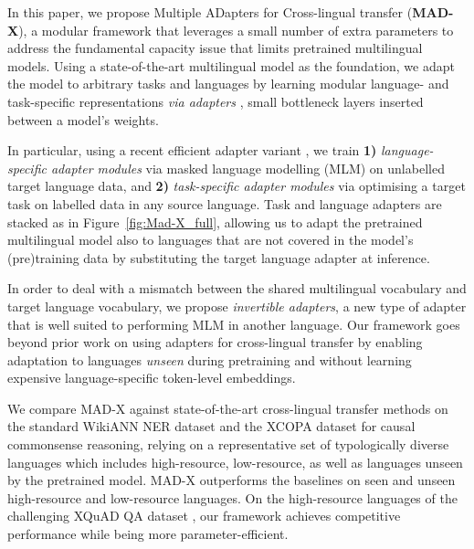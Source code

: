\documentclass[11pt,a4paper]{article}
\newcommand{\model}[1]{\textsc{MAD-X}}
\newcommand{\wann}[1]{WikiANN}
\begin{document}
In this paper, we propose \textsc{M}ultiple \textsc{AD}apters for Cross-lingual transfer (\textbf{\model{}}), a modular framework that leverages a small number of extra parameters to address the fundamental capacity issue that limits pretrained multilingual models. Using a state-of-the-art multilingual model as the foundation, we adapt the model to arbitrary tasks and languages by learning modular language- and task-specific representations \textit{via adapters} \cite{Rebuffi2017adapters,Houlsby2019adapters}, small bottleneck layers inserted between a model's weights.

In particular, using a recent efficient adapter variant \cite{Pfeiffer2020adapterfusion, rueckle2020adapterdrop}, we train \textbf{1)} \textit{language-specific adapter modules} via masked language modelling (MLM) on unlabelled target language data, and \textbf{2)} \textit{task-specific adapter modules} via optimising a target task on labelled data in any source language. Task and language adapters are stacked as in Figure~\ref{fig:Mad-X_full}, allowing us to adapt the pretrained multilingual model also to languages that are not covered in the model's (pre)training data by substituting the target language adapter at inference.

In order to deal with a mismatch between the shared multilingual vocabulary and target language vocabulary, we propose \textit{invertible adapters}, a new type of adapter that is well suited to performing MLM in another language. Our framework goes beyond prior work on using adapters for cross-lingual transfer \cite{Bapna2019adapters,Artetxe2020cross-lingual} by enabling adaptation to languages \textit{unseen} during pretraining and without learning expensive language-specific token-level embeddings. 

 

We compare \model{} against state-of-the-art cross-lingual transfer methods on the standard \wann{} NER dataset \cite{Pan2017wikiann,Rahimi2019massively} and the XCOPA dataset \cite{Ponti2020xcopa} for causal commonsense reasoning, relying on a representative set of typologically diverse languages which includes high-resource, low-resource, as well as languages unseen by the pretrained model. \model{} outperforms the baselines on seen and unseen high-resource and low-resource languages. On the high-resource languages of the challenging XQuAD QA dataset \cite{Artetxe2020cross-lingual}, our framework achieves competitive performance while being more parameter-efficient.
\end{document}
